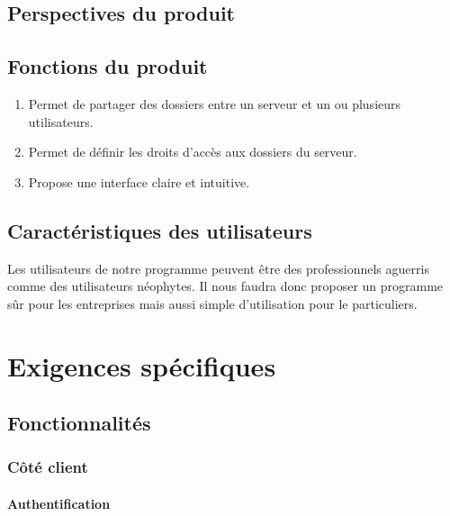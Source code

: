 \documentclass[10pt,a4paper]{report}
\begin{document}
\subsection{Perspectives du produit}

\subsection{Fonctions du produit}
\begin{enumerate}
\item Permet de partager des dossiers entre un serveur et un ou plusieurs utilisateurs.
\item Permet de définir les droits d'accès aux dossiers du serveur.
\item Propose une interface claire et intuitive.
\end{enumerate}

\subsection{Caractéristiques des utilisateurs}
Les utilisateurs de notre programme peuvent être des professionnels aguerris comme des utilisateurs néophytes. Il nous faudra donc proposer un programme sûr pour les entreprises mais aussi simple d'utilisation pour le particuliers.

\section{Exigences spécifiques}

\subsection{Fonctionnalités}

\subsubsection{Côté client}
\paragraph{Authentification}
\end{document}
